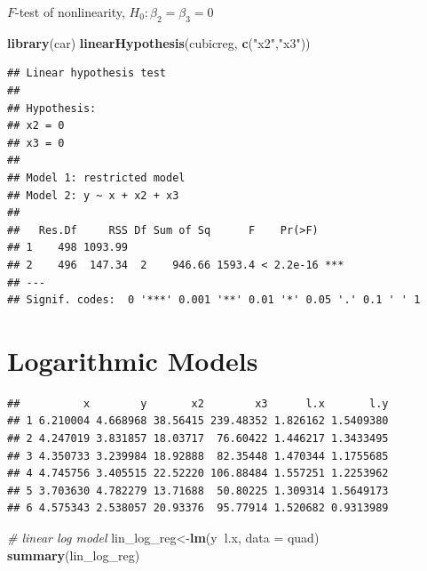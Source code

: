 \documentclass[]{book}
\newenvironment{Shaded}{\begin{snugshade}}{\end{snugshade}}
\newcommand{\KeywordTok}[1]{\textcolor[rgb]{0.13,0.29,0.53}{\textbf{#1}}}
\newcommand{\DataTypeTok}[1]{\textcolor[rgb]{0.13,0.29,0.53}{#1}}
\newcommand{\StringTok}[1]{\textcolor[rgb]{0.31,0.60,0.02}{#1}}
\newcommand{\CommentTok}[1]{\textcolor[rgb]{0.56,0.35,0.01}{\textit{#1}}}
\newcommand{\OperatorTok}[1]{\textcolor[rgb]{0.81,0.36,0.00}{\textbf{#1}}}
\newcommand{\NormalTok}[1]{#1}
\theoremstyle{definition}
\theoremstyle{definition}
\theoremstyle{definition}
\theoremstyle{remark}
\begin{document}
\(F\)-test of nonlinearity, \(H_0: \beta_2=\beta_3=0\)

\begin{Shaded}
\begin{Highlighting}[]
\KeywordTok{library}\NormalTok{(car)}
\KeywordTok{linearHypothesis}\NormalTok{(cubicreg, }\KeywordTok{c}\NormalTok{(}\StringTok{"x2"}\NormalTok{,}\StringTok{"x3"}\NormalTok{))}
\end{Highlighting}
\end{Shaded}

\begin{verbatim}
## Linear hypothesis test
## 
## Hypothesis:
## x2 = 0
## x3 = 0
## 
## Model 1: restricted model
## Model 2: y ~ x + x2 + x3
## 
##   Res.Df     RSS Df Sum of Sq      F    Pr(>F)    
## 1    498 1093.99                                  
## 2    496  147.34  2    946.66 1593.4 < 2.2e-16 ***
## ---
## Signif. codes:  0 '***' 0.001 '**' 0.01 '*' 0.05 '.' 0.1 ' ' 1
\end{verbatim}

\section{Logarithmic Models}\label{logarithmic-models}

\begin{Shaded}
\end{Shaded}

\begin{verbatim}
##          x        y       x2        x3      l.x       l.y
## 1 6.210004 4.668968 38.56415 239.48352 1.826162 1.5409380
## 2 4.247019 3.831857 18.03717  76.60422 1.446217 1.3433495
## 3 4.350733 3.239984 18.92888  82.35448 1.470344 1.1755685
## 4 4.745756 3.405515 22.52220 106.88484 1.557251 1.2253962
## 5 3.703630 4.782279 13.71688  50.80225 1.309314 1.5649173
## 6 4.575343 2.538057 20.93376  95.77914 1.520682 0.9313989
\end{verbatim}

\begin{Shaded}
\begin{Highlighting}[]
\CommentTok{# linear log model}
\NormalTok{lin_log_reg<-}\KeywordTok{lm}\NormalTok{(y}\OperatorTok{~}\NormalTok{l.x, }\DataTypeTok{data =}\NormalTok{ quad)}
\KeywordTok{summary}\NormalTok{(lin_log_reg)}
\end{Highlighting}
\end{Shaded}
\end{document}
